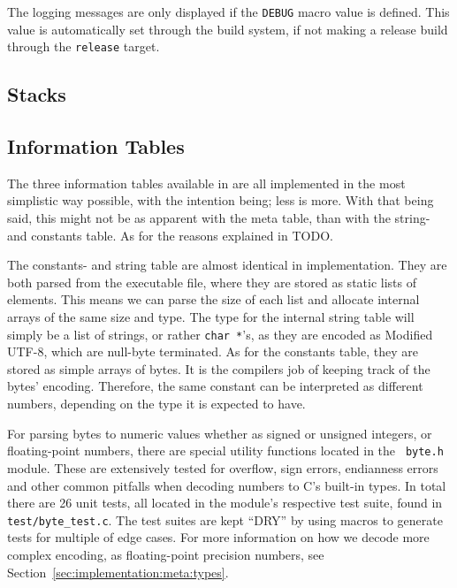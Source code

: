 The logging messages are only displayed if the {\tt DEBUG} macro value is
defined. This value is automatically set through the build system, if not making
a release build through the {\tt release} target.

\subsection{Stacks}
\label{sec:implementation:stacks}


\subsection{Information Tables}
\label{sec:implementation:infotables}

The three information tables available in \thename{} are all implemented in the
most simplistic way possible, with the intention being; less is more. With that
being said, this might not be as apparent with the meta table, than with the
string- and constants table. As for the reasons explained in TODO. %

The constants- and string table are almost identical in implementation. They are
both parsed from the executable file, where they are stored as static lists of
elements. This means we can parse the size of each list and allocate internal
arrays of the same size and type. The type for the internal string table will
simply be a list of strings, or rather {\tt char *}'s, as they are encoded as
Modified UTF-8, which are null-byte terminated. As for the constants table, they
are stored as simple arrays of bytes. It is the compilers job of keeping track
of the bytes' encoding. Therefore, the same constant can be interpreted as
different numbers, depending on the type it is expected to have.

For parsing bytes to numeric values whether as signed or unsigned integers, or
floating-point numbers, there are special utility functions located in the {\tt
  byte.h} module. These are extensively tested for overflow, sign errors,
endianness errors and other common pitfalls when decoding numbers to C's
built-in types. In total there are 26 unit tests, all located in the module's
respective test suite, found in {\tt test/byte\_test.c}. The test suites are
kept ``DRY'' by using macros to generate tests for multiple of edge cases. For
more information on how we decode more complex encoding, as floating-point
precision numbers, see Section~\ref{sec:implementation:meta:types}.

